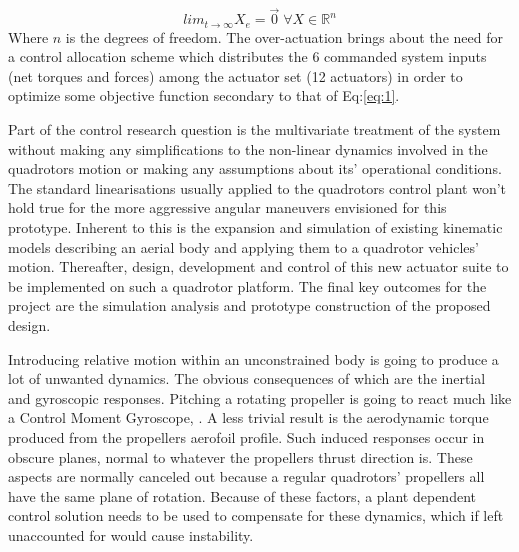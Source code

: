 \begin{equation} \label{eq:1}
lim_{t \rightarrow \infty} X_e = \vec{0}\;\forall X \in \mathbb{R}^n
\end{equation}
Where $n$ is the degrees of freedom. The over-actuation brings about the need for a control allocation scheme which distributes the 6 commanded system inputs (net torques and forces) among the actuator set (12 actuators) in order to optimize some objective function secondary to that of Eq:\ref{eq:1}.
\par
Part of the control research question is the multivariate treatment of the system without making any simplifications to the non-linear dynamics involved in the quadrotors motion or making any assumptions about its' operational conditions. The standard linearisations usually applied to the quadrotors control plant won't hold true for the more aggressive angular maneuvers envisioned for this prototype. Inherent to this is the expansion and simulation of existing kinematic models describing an aerial body and applying them to a quadrotor vehicles' motion. Thereafter, design, development and control of this new actuator suite to be implemented on such a quadrotor platform. The final key outcomes for the project are the simulation analysis and prototype construction of the proposed design.
\par
Introducing relative motion within an unconstrained body is going to produce a lot of unwanted dynamics. The obvious consequences of which are the inertial and gyroscopic responses. Pitching a rotating propeller is going to react much like a Control Moment Gyroscope, \cite{cmg}. A less trivial result is the aerodynamic torque produced from the propellers aerofoil profile. Such induced responses occur in obscure planes, normal to whatever the propellers thrust direction is. These aspects are normally canceled out because a regular quadrotors' propellers all have the same plane of rotation. Because of these factors, a plant dependent control solution needs to be used to compensate for these dynamics, which if left unaccounted for would cause instability. 
